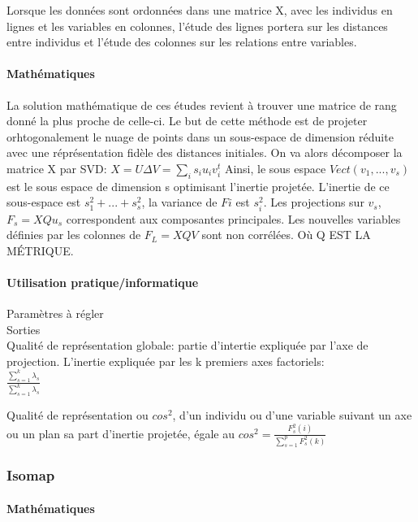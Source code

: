 \documentclass[12pt]{report}
\begin{document}
Lorsque les données sont ordonnées dans une matrice X, avec les individus en lignes et les variables en colonnes, l'étude des lignes portera sur les distances entre individus et l'étude des colonnes sur les relations entre variables.

\paragraph{Mathématiques}
La solution mathématique de ces études revient à trouver une matrice de rang donné la plus proche de celle-ci. 
Le but de cette méthode est de projeter orhtogonalement le nuage de points dans un sous-espace de dimension réduite avec une réprésentation fidèle des distances initiales.
On va alors décomposer la matrice X par SVD: $ X=U \Delta V = \sum_{i}{ s_{i}u_{i}v_{i}^{t}}$
Ainsi, le sous espace $Vect(v_{1},...,v_{s})$ est le sous espace de dimension s optimisant l'inertie projetée.
L'inertie de ce sous-espace est $s_{1}^{2}+...+s_{s}^{2}$, la variance de $F{i}$ est $s_{i}^{2}$.
Les projections sur $v_{s}$, $F_{s}=XQu_{s}$ correspondent aux composantes principales.
Les nouvelles variables définies par les colonnes de $F_{L} =XQV$ sont non corrélées.
Où Q EST LA MÉTRIQUE.

\paragraph{Utilisation pratique/informatique}

Paramètres à régler\\




Sorties \\

Qualité de représentation globale: partie d'intertie expliquée par l'axe de projection. L'inertie expliquée par les k premiers axes factoriels:\\ $ \frac {\sum_{s=1}^{k}{\lambda_{s}}}{\sum_{s=1}^{k}{\lambda_{s}}}$

Qualité de représentation ou $cos^{2}$, d'un individu ou d'une variable suivant un axe ou un plan sa part d'inertie projetée, égale au $cos^{2}=\frac {F_{s}^{2}(i)}{\sum_{s=1}^{p}{F_{s}^{2}(k)}}$

\subsubsection{Isomap}

\paragraph{Mathématiques}
\end{document}
